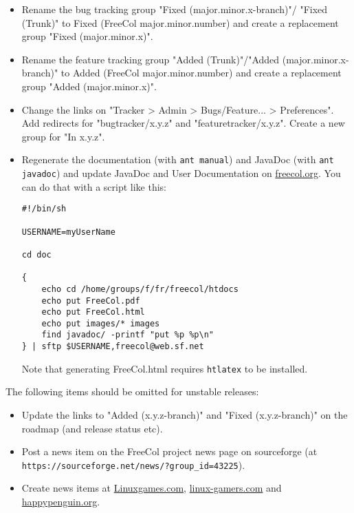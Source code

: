 \documentclass[12pt]{book}
\begin{document}
\begin{itemize}

\item Rename the bug tracking group "Fixed (major.minor.x-branch)"/
  "Fixed (Trunk)" to Fixed (FreeCol major.minor.number) and create a
  replacement group "Fixed (major.minor.x)".

\item Rename the feature tracking group "Added (Trunk)"/"Added
  (major.minor.x-branch)" to Added (FreeCol major.minor.number) and
  create a replacement group "Added (major.minor.x)".

\item Change the links on "Tracker > Admin > Bugs/Feature... >
  Preferences". Add redirects for "bugtracker/x.y.z" and
  "featuretracker/x.y.z". Create a new group for "In x.y.z".

\item Regenerate the documentation (with \verb+ant manual+) and
  JavaDoc (with \verb+ant javadoc+) and update JavaDoc and User
  Documentation on \href{freecol.org}{freecol.org}. You can do that
  with a script like this:

\begin{verbatim}
#!/bin/sh

USERNAME=myUserName

cd doc

{
    echo cd /home/groups/f/fr/freecol/htdocs
    echo put FreeCol.pdf
    echo put FreeCol.html
    echo put images/* images
    find javadoc/ -printf "put %p %p\n"
} | sftp $USERNAME,freecol@web.sf.net

\end{verbatim}

Note that generating FreeCol.html requires \verb+htlatex+
to be installed.


\end{itemize}

The following items should be omitted for unstable releases:

\begin{itemize}

\item Update the links to "Added (x.y.z-branch)" and "Fixed
  (x.y.z-branch)" on the roadmap (and release status etc).

\item Post a news item on the FreeCol project news page on sourceforge
(at \verb+https://sourceforge.net/news/?group_id=43225+).

\item Create news items at \href{Linuxgames.com}{Linuxgames.com},
  \href{linux-gamers.com}{linux-gamers.com} and
  \href{happypenguin.org}{happypenguin.org}.

\end{itemize}
\end{document}
